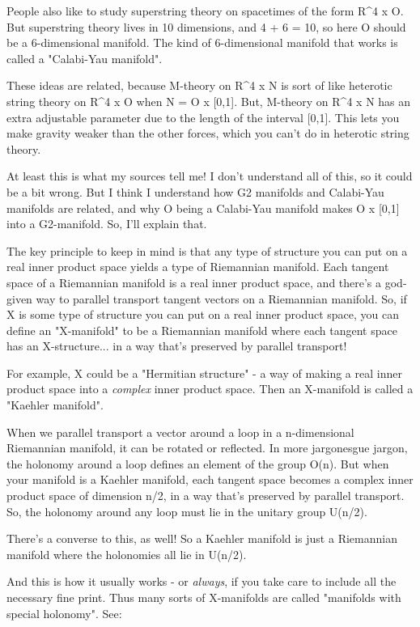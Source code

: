 People also like to study superstring theory on spacetimes of the 
form R^{4} x O.  But superstring theory lives in 10 dimensions, and 
4 + 6 = 10, so here O should be a 6-dimensional manifold.  The kind 
of 6-dimensional manifold that works is called a "Calabi-Yau manifold".  

These ideas are related, because M-theory on R^{4} x N is sort of 
like heterotic string theory on R^{4} x O when N = O x [0,1].  But, 
M-theory on R^{4} x N has an extra adjustable parameter due to the 
length of the interval [0,1].  This lets you make gravity weaker 
than the other forces, which you can't do in heterotic string theory.

At least this is what my sources tell me!   I don't understand all 
of this, so it could be a bit wrong.  But I think I understand how
G2 manifolds and Calabi-Yau manifolds are related, and why O being a
Calabi-Yau manifold makes O x [0,1] into a G2-manifold.  So, I'll explain 
that.

The key principle to keep in mind is that any type of structure you
can put on a real inner product space yields a type of Riemannian 
manifold.  Each tangent space of a Riemannian manifold is a real inner
product space, and there's a god-given way to parallel transport tangent 
vectors on a Riemannian manifold.  So, if X is some type of structure 
you can put on a real inner product space, you can define an "X-manifold" 
to be a Riemannian manifold where each tangent space has an X-structure... 
in a way that's preserved by parallel transport!

For example, X could be a "Hermitian structure" - a way of making a
real inner product space into a \emph{complex} inner product space.  Then 
an X-manifold is called a "Kaehler manifold".  

When we parallel transport a vector around a loop in a n-dimensional
Riemannian manifold, it can be rotated or reflected.  In more jargonesgue
jargon, the holonomy around a loop defines an element of the group O(n).  
But when your manifold is a Kaehler manifold, each tangent space becomes 
a complex inner product space of dimension n/2, in a way that's preserved 
by parallel transport.  So, the holonomy around any loop must lie in 
the unitary group U(n/2).   

There's a converse to this, as well!  So a Kaehler manifold is just a 
Riemannian manifold where the holonomies all lie in U(n/2).  

And this is how it usually works - or \emph{always}, if you take care
to include all the necessary fine print.  Thus many sorts of
X-manifolds are called "manifolds with special holonomy".  See:

